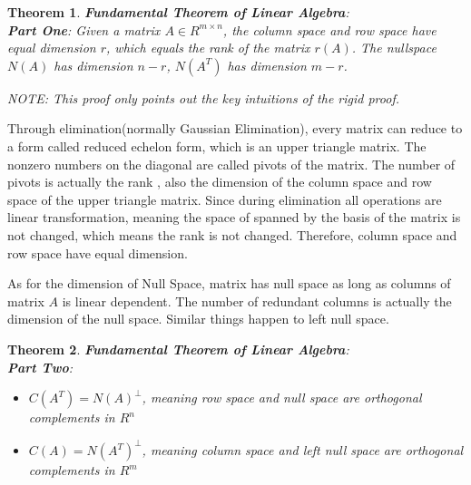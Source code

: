 \documentclass[a4paper]{book}
\newtheorem{theorem}{Theorem}[section]
\newenvironment{proof}[1][Proof]{\begin{trivlist}
\item[\hskip \labelsep {\bfseries #1}]}{\end{trivlist}}
\begin{document}
    \begin{theorem}
      \textbf{Fundamental Theorem of Linear Algebra}:\\
      \textbf{Part One}: Given a matrix $A \in R^{m \times n}$, the
      column space and row space have equal dimension $r$, which equals
      the rank of the matrix $r(A)$. The nullspace $N(A)$ has dimension
      $n - r$, $N(A^{T})$ has dimension $m - r$.
    \end{theorem}

    \begin{proof}

      \textit{NOTE: This proof only points out the key intuitions of the
      rigid proof.}

      Through elimination(normally Gaussian Elimination), every matrix
      can reduce to a form called reduced echelon form, which is an upper
      triangle matrix. The nonzero numbers on the diagonal are called
      pivots of the matrix. The number of pivots is actually the rank ,
      also the dimension of the column space and row space of the upper
      triangle matrix. Since during elimination all operations are
      linear transformation, meaning the space of spanned by the basis
      of the matrix is not changed, which means the rank is not changed.
      Therefore, column space and row space have equal dimension.

      As for the dimension of Null Space, matrix has null space as long
      as columns of matrix $A$ is linear dependent. The number of
      redundant columns is actually the dimension of the null space.
      Similar things happen to left null space.
    \end{proof}

    \begin{theorem}
      \textbf{Fundamental Theorem of Linear Algebra}:\\
      \textbf{Part Two}:
      \begin{itemize}
        \item  $C(A^{T}) = N(A)^{\bot}$, meaning row space and null space are
               orthogonal complements in $R^{n}$
        \item  $C(A) = N(A^{T})^{\bot}$, meaning column space and left null space
               are orthogonal complements in $R^{m}$
      \end{itemize}
    \end{theorem}
\end{document}
